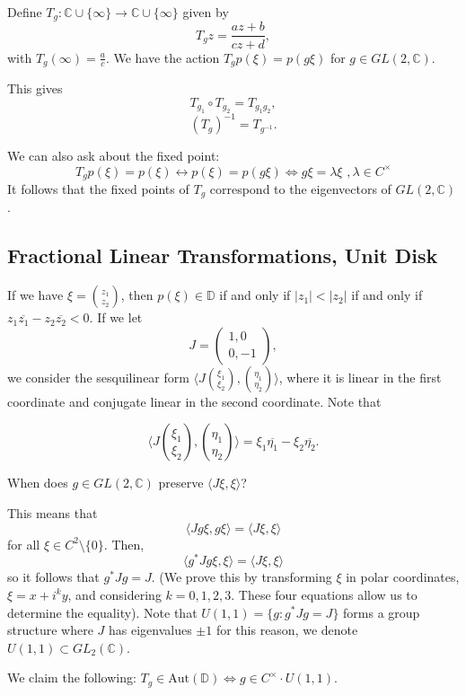 \documentclass[12pt]{scrartcl}
\newcommand{\C}{\mathbb C}
\let \ol \overline
\begin{document}
Define $T_g: \C \cup \{\infty\} \to \C \cup \{\infty\}$ given by 
$$T_g z = \frac{az+b}{cz+d},$$
with $T_g (\infty )= \frac{a}{c}$.  We have the action $T_gp(\xi) = p(g\xi)$ for $g \in GL(2, \C)$.  

This gives 
$$T_{g_1} \circ T_{g_2} = T_{g_1g_2},$$
$$(T_g)^{-1} = T_{g^{-1}}.$$
 
We can also ask about the fixed point: $$T_gp(\xi) = p(\xi) \leftrightarrow p(\xi) = p(g\xi) \Leftrightarrow
 g\xi = \lambda \xi\,\, ,\lambda \in C^\times$$
 It follows that the fixed points of $T_g$ correspond to the eigenvectors of $GL(2, \C)$.
 
\subsection{Fractional Linear Transformations, Unit Disk}
If we have $\xi = \binom{z_1}{z_2}$, then $p(\xi) \in \mathbb D$ if and only if $|z_1| < |z_2|$ if and only if $z_1 \ol{z_1} - z_2 \ol{z_2} < 0$.  If we let $$J = \begin{pmatrix}
1, 0\\
0, -1
\end{pmatrix},$$
we consider the sesquilinear form $\langle J\binom{\xi_1}{\xi_2}, \binom{\eta_1}{\eta_2}\rangle$, where it is linear in the first coordinate and conjugate linear in the second coordinate.  Note that 

$$\langle J\binom{\xi_1}{\xi_2}, \binom{\eta_1}{\eta_2}\rangle = \xi_1 \ol{\eta_1} - \xi_2 \ol{\eta_2}.$$

When does $g \in GL(2, \C)$ preserve $\langle J\xi, \xi\rangle$?

This means that 
$$\langle Jg\xi, g\xi \rangle = \langle J\xi, \xi \rangle$$
for all $\xi \in C^2 \setminus \{0\}$.  Then,
$$\langle g^* Jg \xi, \xi\rangle = \langle J\xi, \xi\rangle$$
so it follows that $g^*Jg = J$.  (We prove this by transforming $\xi$ in polar coordinates, $\xi = x + i^k y$, and considering $k = 0, 1, 2, 3$.  These four equations allow us to determine the equality).  Note that $U(1, 1) = \{g : g^* J g = J\}$ forms a group structure where $J$ has eigenvalues $\pm 1$  for this reason, we denote $U(1, 1) \subset GL_2(\C)$.

We claim the following: $T_g \in \text{Aut}(\mathbb D) \Leftrightarrow g \in C^\times \cdot U(1, 1)$.
%
%
\end{document}
